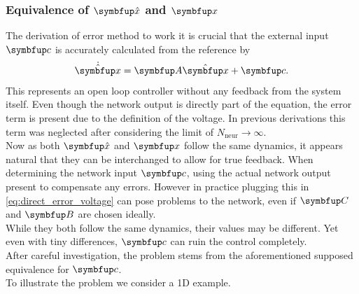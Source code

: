\subsubsection{Equivalence of $\bmu{\hat{x}}$ and $\bmu{x}$}
The derivation of error method to work it is crucial that the external input $\bmu{c}$ is accurately calculated from the reference by
\begin{equation}
	\dot{\hat{\bmu{x}}} = \bmu{A}\hat{\bmu{x}} + \bmu{c}.
\end{equation}
This represents an open loop controller without any feedback from the system itself. Even though the network output is directly part of the equation, the error term is present due to the definition of the voltage. In previous derivations this term was neglected after considering the limit of $N_{\text{neur}}\longrightarrow \infty$.\\
Now as both $\bmu{\hat{x}}$ and $\bmu{x}$ follow the same dynamics, it appears natural that they can be interchanged to allow for true feedback. When determining the network input $\bmu{c}$, using the actual network output present to compensate any errors. However in practice plugging this in \cref{eq:direct_error_voltage} can pose problems to the network, even if $\bmu{C}$ and $\bmu{B}$ are chosen ideally.\\
While they both follow the same dynamics, their values may be different. Yet even with tiny differences, $\bmu{c}$ can ruin the control completely.\\
After careful investigation, the problem stems from the aforementioned supposed equivalence for $\bmu{c}$.\\
To illustrate the problem we consider a 1D example.
